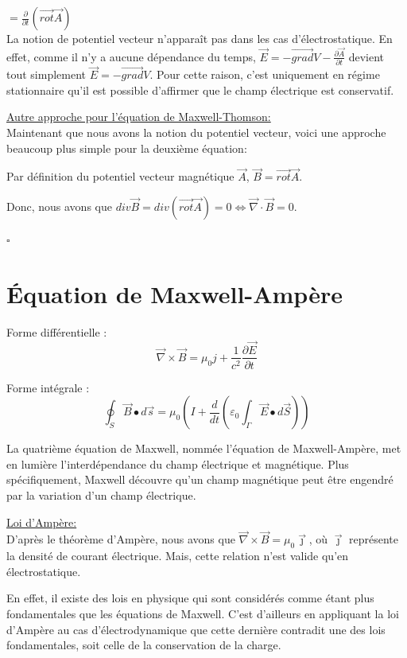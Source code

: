 \documentclass[12pt]{article}
\begin{document}
\noindent $=\frac{\partial}{\partial t}(\vec{rot}\vec{A})$
\vspace{2em}
\\\noindent La notion de potentiel vecteur n'apparaît pas dans les cas d'électrostatique. En effet, comme il n'y a aucune dépendance du temps, $\vec{E}=-\vec{grad}V-\frac{\partial \vec{A}}{\partial t}$ devient tout simplement $\vec{E}=-\vec{grad}V$. Pour cette raison, c'est uniquement en régime stationnaire qu'il est possible d'affirmer que le champ électrique est conservatif.

\noindent \underline{Autre approche pour l'équation de Maxwell-Thomson:}
\\ \noindent Maintenant que nous avons la notion du potentiel vecteur, voici une approche beaucoup plus simple pour la deuxième équation: 

\newcommand{\proofend}{\hspace*{14cm} $\square$}

\noindent Par définition du potentiel vecteur magnétique $\vec{A}$, $\vec{B} = \vec{rot}\vec{A}$.\

\noindent Donc, nous avons que $div\vec{B} = div(\vec{rot}\vec{A}) = 0 \Leftrightarrow \vec{\nabla} \cdot \vec{B} = 0$.

\proofend


\newpage\section*{Équation de Maxwell-Ampère}

Forme différentielle :
$$\vec{\nabla} \times \vec{B} = \mu_0j + \frac{1}{c^2}\frac{\partial \vec{E}}{\partial t}$$

Forme intégrale : $$\oint_S \Vec{B} \bullet d\Vec{s} = \mu_0 (I + \frac{d}{dt} (\varepsilon_0 \int_\Gamma\Vec{E} \bullet d\Vec{S})) $$

\noindent La quatrième équation de Maxwell, nommée l'équation de Maxwell-Ampère, met en lumière l'interdépendance du champ électrique et magnétique. Plus spécifiquement, Maxwell découvre qu'un champ magnétique peut être engendré par la variation d'un champ électrique.

\noindent\underline{Loi d'Ampère:}
\\\noindent D'après le théorème d'Ampère, nous avons que $\vec{\nabla} \times \vec{B} = \mu_0\vec{\jmath}$, où $\vec{\jmath}$ représente la densité de courant électrique. Mais, cette relation n'est valide qu'en électrostatique.

\noindent En effet, il existe des lois en physique qui sont considérés comme étant plus fondamentales que les équations de Maxwell. C'est d'ailleurs en appliquant la loi d'Ampère au cas d'électrodynamique que cette dernière contradit une des lois fondamentales, soit celle de la conservation de la charge. 
\end{document}
